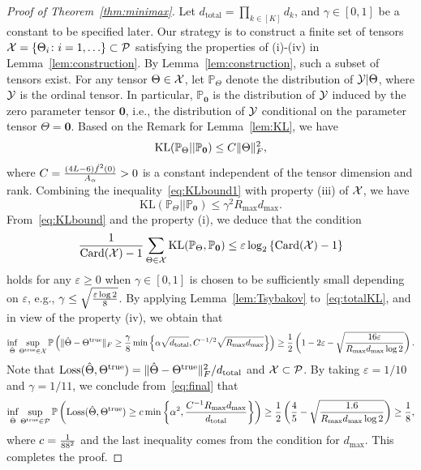 \documentclass[11pt]{article}
\theoremstyle{plain}
\theoremstyle{definition}
\begin{document}
\begin{proof}[Proof of Theorem~\ref{thm:minimax}]

Let $d_{\text{total}}=\prod_{k\in[K]}d_k$, and $\gamma\in[0,1]$ be a constant to be specified later.  Our strategy is to construct a finite set of tensors $\mathcal{X}=\{\Theta_i\colon i=1,\ldots \}\subset \mathcal{P}$ satisfying the properties of (i)-(iv) in Lemma~\ref{lem:construction}. By Lemma~\ref{lem:construction}, such a subset of tensors exist. For any tensor  $\Theta\in\mathcal{X}$, let $\mathbb{P}_{\Theta}$ denote the distribution of $\mathcal{Y}|\Theta$, where $\mathcal{Y}$ is the ordinal tensor. In particular, $\mathbb{P}_{\mathbf{0}}$ is the distribution of $\mathcal{Y}$ induced by the zero parameter tensor $\mathbf{0}$, i.e., the distribution of $\mathcal{Y}$ conditional on the parameter tensor $\Theta=\mathbf{0}$. Based on the Remark for Lemma~\ref{lem:KL}, we have
\begin{equation}\label{eq:KLbound1}
\mathrm{KL}(\mathbb{P}_{\Theta}|| \mathbb{P}_{\mathbf{0}})\leq C \lVert\Theta\rVert_F^2,
\end{equation}
where $C={(4L-6) \dot{f}^2(0)\over  A_\alpha}>0$ is a constant independent of the tensor dimension and rank.
Combining the inequality~\eqref{eq:KLbound1} with property (iii) of $\mathcal{X}$, we have
\begin{equation}\label{eq:KLbound}
\text{KL}(\mathbb{P}_{\Theta}||\mathbb{P}_{\mathbf{0}})\leq \gamma^2 R_{\max} d_{\max}.
\end{equation}
From~\eqref{eq:KLbound} and the property (i), we deduce that the condition
\begin{equation}\label{eq:totalKL}
{1\over \text{Card}(\mathcal{X})-1}\sum_{\Theta \in\mathcal{X}}\text{KL}(\mathbb{P}_{\Theta}, \mathbb{P}_{\mathbf{0}})\leq \varepsilon \log_2\left\{\text{Card}(\mathcal{X})-1 \right\}
\end{equation}
holds for any $ \varepsilon \geq 0$ when $\gamma\in[0,1]$ is chosen to be sufficiently small depending on $\varepsilon$, e.g., $\gamma \leq \sqrt{\varepsilon\log2\over8}$. By applying Lemma~\ref{lem:Tsybakov} to~\eqref{eq:totalKL}, and in view of the property (iv), we obtain that
\begin{equation}\label{eq:final}
\inf_{\hat \Theta}\sup_{\Theta^{\text{true}}\in \mathcal{X}}\mathbb{P}\left(\lVert\hat \Theta- \Theta^{\text{true}}\rVert_F\geq  {\gamma\over 8} \min\left\{ \alpha\sqrt{d_{\text{total}}}, C^{-1/2}\sqrt{ R_{\max}d_{\max}}\right\} \right)\geq {1\over 2}\left(1-2\varepsilon-\sqrt{16 \varepsilon \over R_{\max}d_{\max}\log2}\right).
\end{equation}
Note that $\text{Loss}(\hat \Theta, \Theta^{\text{true}})=\lVert\hat \Theta- \Theta^{\text{true}}\rVert_F^2/d_{\text{total}}$ and $\mathcal{X}\subset \mathcal{P}$. By taking $\varepsilon=1/10$ and $\gamma=1/11$, we conclude from~\eqref{eq:final} that
\begin{equation*}\label{eq:prob}
\inf_{\hat \Theta}\sup_{\Theta^{\text{true}}\in \mathcal{P}}\mathbb{P}\left(\text{Loss}(\hat \Theta, \Theta^{\text{true}})\geq c\min\left \{ \alpha^2,  {C^{-1}R_{\max}d_{\max}\over d_{\text{total}}}\right \}\right)\geq {1\over 2}\left({4\over 5}- \sqrt{1.6\over R_{\max}d_{\max}\log2} \right)\geq {1\over 8},
\end{equation*}
where $c = {1 \over 88^2}$ and the last inequality comes from the condition for $d_{\text{max}}$.
This completes the proof.
\end{proof}
\end{document}
